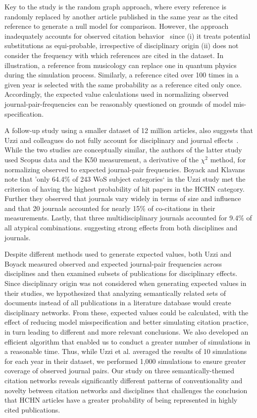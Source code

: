 \documentclass[NETN]{stjour}
\begin{document}
Key to the study is the random graph approach, where every reference is randomly replaced by another article published in the same year as the cited reference to generate a null model for comparison. However, the approach inadequately accounts for observed citation behavior~\citep{wallace_lariviere_gingras_2012,moed_measuring_2010,klavans_research_2017} since (i) it treats potential substitutions as equi-probable, irrespective of disciplinary origin (ii) does not consider the frequency with which references are cited in the dataset. In illustration, a reference from musicology can replace one in quantum physics during the simulation process. Similarly, a reference cited over 100 times in a given year is selected with the same probability as a reference cited only once. Accordingly, the expected value calculations used in normalizing observed journal-pair-frequencies can be reasonably questioned on grounds of model mis-specification. 

A follow-up study using a smaller dataset of 12 million articles, also suggests that Uzzi and colleagues do not fully account for disciplinary and journal effects~\citep{boyack_vs_uzzi_2014}. While the two studies are conceptually similar, the authors of the latter study used Scopus data and the K50 measurement, a derivative of the $\chi^2$ method, for normalizing observed to expected journal-pair frequencies. Boyack and Klavans note that 'only 64.4\%  of  243  WoS  subject  categories` in the Uzzi study met the criterion of having the highest probability of hit papers in the HCHN category. Further they observed that journals vary widely in terms of size and influence and that 20 journals accounted for nearly 15\% of co-citations in their measurements. Lastly, that three multidisciplinary journals accounted for 9.4\% of all atypical combinations. suggesting strong effects from both disciplines and journals. 

Despite different methods used to generate expected values, both Uzzi and Boyack measured observed and expected journal-pair frequencies across disciplines and then examined subsets of publications for disciplinary effects. Since disciplinary origin was not considered when generating expected values in their studies, we hypothesized that analyzing semantically related sets of documents instead of all publications in a literature database would create disciplinary networks. From these, expected values could be calculated, with the effect of reducing model misspecification and better simulating citation practice, in turn leading to different and more relevant conclusions.  We also developed an efficient algorithm that enabled us to conduct a greater number of simulations in a reasonable time. Thus, while Uzzi et al. averaged the results of 10 simulations for each year in their dataset, we performed 1,000 simulations to ensure greater coverage of observed journal pairs. Our study on three semantically-themed citation networks reveals significantly different patterns of conventionality and novelty between  citation networks and disciplines that challenges the conclusion that HCHN articles have a greater probability of being represented in highly cited publications.
\end{document}
